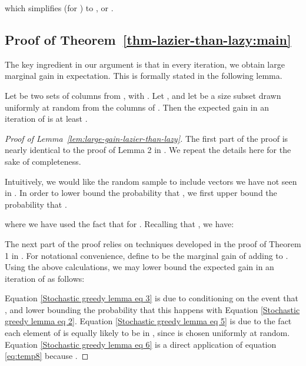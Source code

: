 \documentclass{article}
\begin{document}
which simplifies (for ) to , or .


\subsection{Proof of Theorem~\ref{thm-lazier-than-lazy:main}} \label{app:thm-lazier-than-lazy}
The key ingredient in our argument is that in every iteration, we obtain large marginal gain in expectation. This is formally stated in the following lemma.

\begin{lemma} \label{lem:large-gain-lazier-than-lazy}
Let  be two sets of columns from , with . Let , and let  be a size  subset drawn uniformly at random from the columns of .  Then the expected gain in an iteration of  is at least .
\end{lemma}

\begin{proof}[Proof of Lemma~\ref{lem:large-gain-lazier-than-lazy}]
The first part of the proof is nearly identical to the proof of Lemma 2 in \cite{Mirzasoleiman}. We repeat the details here for the sake of completeness.

Intuitively, we would like the random sample  to include vectors we have not seen in . In order to lower bound the probability that , we first upper bound the probability that .

where we have used the fact that  for . Recalling that , we have:

The next part of the proof relies on techniques developed in the proof of Theorem 1 in \cite{Mirzasoleiman}. For notational convenience, define  to be the marginal gain of adding  to . Using the above calculations, we may lower bound the expected gain  in an iteration of  as follows:

Equation \eqref{Stochastic greedy lemma eq 3} is due to conditioning on the event that , and lower bounding the probability that this happens with Equation \eqref{Stochastic greedy lemma eq 2}. Equation \eqref{Stochastic greedy lemma eq 5} is due to the fact each element of  is equally likely to be in , since  is chosen uniformly at random. Equation \eqref{Stochastic greedy lemma eq 6} is a direct application of equation \eqref{eq:temp8} because .
\end{proof}
\end{document}

